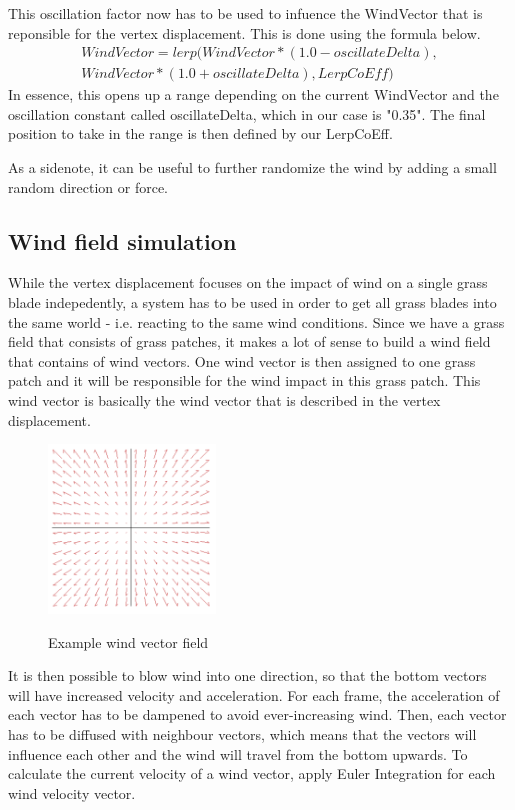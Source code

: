 \documentclass[conference]{acmsiggraph}
\begin{document}
This oscillation factor now has to be used to infuence the WindVector that is reponsible for the vertex displacement. This is done using the formula below.
\begin{equation}
\begin{split}
WindVector = lerp(WindVector * (1.0 - oscillateDelta), \\ 
WindVector * (1.0 + oscillateDelta), LerpCoEff)
\end{split}
\end{equation}
In essence, this opens up a range depending on the current WindVector and the oscillation constant called oscillateDelta, which in our case is "0.35". The final position to take in the range is then defined by our LerpCoEff.

As a sidenote, it can be useful to further randomize the wind by adding a small random direction or force.

\subsection{Wind field simulation}
While the vertex displacement focuses on the impact of wind on a single grass blade indepedently, a system has to be used in order to get all grass blades into the same world - i.e. reacting to the same wind conditions. Since we have a grass field that consists of grass patches, it makes a lot of sense to build a wind field that contains of wind vectors. One wind vector is then assigned to one grass patch and it will be responsible for the wind impact in this grass patch. This wind vector is basically the wind vector that is described in the vertex displacement.

 \begin{figure}[ht]
   \centering
   \includegraphics[width=1.75in]{images/windField}
   \caption{Example wind vector field} \cite{EddieLee}
 \end{figure}
 
It is then possible to blow wind into one direction, so that the bottom vectors will have increased velocity and acceleration. For each frame, the acceleration of each vector has to be dampened to avoid ever-increasing wind. Then, each vector has to be diffused with neighbour vectors, which means that the vectors will influence each other and the wind will travel from the bottom upwards. To calculate the current velocity of a wind vector, apply Euler Integration for each wind velocity vector.
\end{document}
